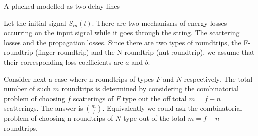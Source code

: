 \documentclass{article}
\begin{document}
A plucked modelled as two delay lines

Let the initial signal $S_{in}(t)$. There are two mechanisms of energy losses occurring on the input signal while it goes through the string. The scattering losses and the propagation losses. Since there are two types of roundtrips, the F-roundtrip (finger roundtrip) and the N-roundtrip (nut roundtrip), we assume that their corresponding loss coefficients are $a$ and $b$.

Consider next a case where  n roundtrips of types $F$ and $N$ respectively. The total number of such $m$ roundtrips is determined by considering the combinatorial problem of choosing $f$ scatterings of $F$ type out the off total $m = f + n$ scatterings. The answer is $\binom{m}{f}$. Equivalently we could ask the combinatorial problem of choosing n roundtrips of $N$ type out of the total $m = f + n$ roundtrips.
\end{document}
